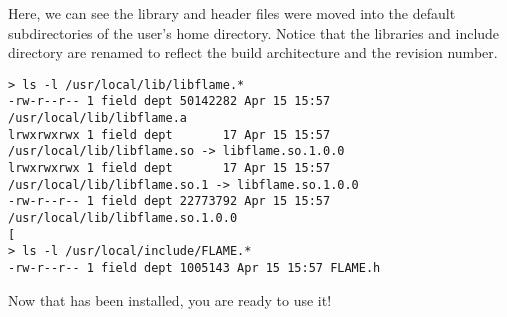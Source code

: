 \noindent
Here, we can see the library and header files were moved into the default
subdirectories of the user's home directory.
Notice that the libraries and include directory are renamed to reflect
the build architecture and the revision number.

\begin{Verbatim}[frame=single,framesep=2.5mm,xleftmargin=5mm,commandchars=\\\{\},fontsize=\footnotesize]
> ls -l /usr/local/lib/libflame.*
-rw-r--r-- 1 field dept 50142282 Apr 15 15:57 /usr/local/lib/libflame.a
lrwxrwxrwx 1 field dept       17 Apr 15 15:57 /usr/local/lib/libflame.so -> libflame.so.1.0.0
lrwxrwxrwx 1 field dept       17 Apr 15 15:57 /usr/local/lib/libflame.so.1 -> libflame.so.1.0.0
-rw-r--r-- 1 field dept 22773792 Apr 15 15:57 /usr/local/lib/libflame.so.1.0.0
[
> ls -l /usr/local/include/FLAME.*
-rw-r--r-- 1 field dept 1005143 Apr 15 15:57 FLAME.h
\end{Verbatim}

Now that \libflame has been installed, you are ready to use it!



%
% 

